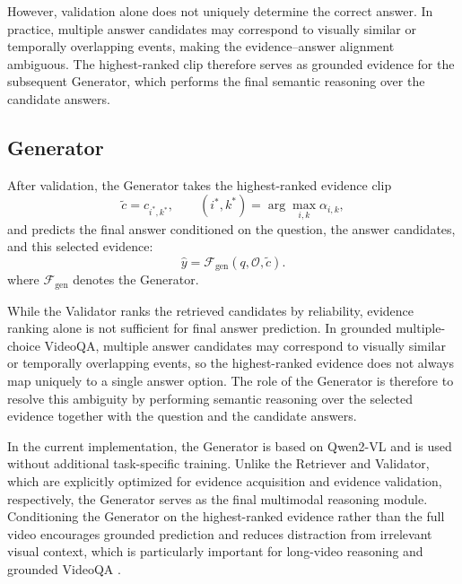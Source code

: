 However, validation alone does not uniquely determine the correct answer. In practice, multiple answer candidates may correspond to visually similar or temporally overlapping events, making the evidence--answer alignment ambiguous. The highest-ranked clip therefore serves as grounded evidence for the subsequent Generator, which performs the final semantic reasoning over the candidate answers.




\subsection{Generator}
\label{sec:generator}

After validation, the Generator takes the highest-ranked evidence clip
\begin{equation}
\tilde{c} = c_{i^\ast,k^\ast}, \qquad
(i^\ast,k^\ast)=\arg\max_{i,k}\alpha_{i,k},
\end{equation}
and predicts the final answer conditioned on the question, the answer candidates, and this selected evidence:
\begin{equation}
\hat{y} = \mathcal{F}_{\text{gen}}(q, \mathcal{O}, \tilde{c}).
\end{equation}
\noindent where $\mathcal{F}_{\text{gen}}$ denotes the Generator.

While the Validator ranks the retrieved candidates by reliability, evidence ranking alone is not sufficient for final answer prediction. In grounded multiple-choice VideoQA, multiple answer candidates may correspond to visually similar or temporally overlapping events, so the highest-ranked evidence does not always map uniquely to a single answer option. The role of the Generator is therefore to resolve this ambiguity by performing semantic reasoning over the selected evidence together with the question and the candidate answers.

In the current implementation, the Generator is based on Qwen2-VL \cite{wang2024qwen2} and is used without additional task-specific training. Unlike the Retriever and Validator, which are explicitly optimized for evidence acquisition and evidence validation, respectively, the Generator serves as the final multimodal reasoning module. Conditioning the Generator on the highest-ranked evidence rather than the full video encourages grounded prediction and reduces distraction from irrelevant visual context, which is particularly important for long-video reasoning and grounded VideoQA \cite{xiao2024can,liu2025videomind}.
